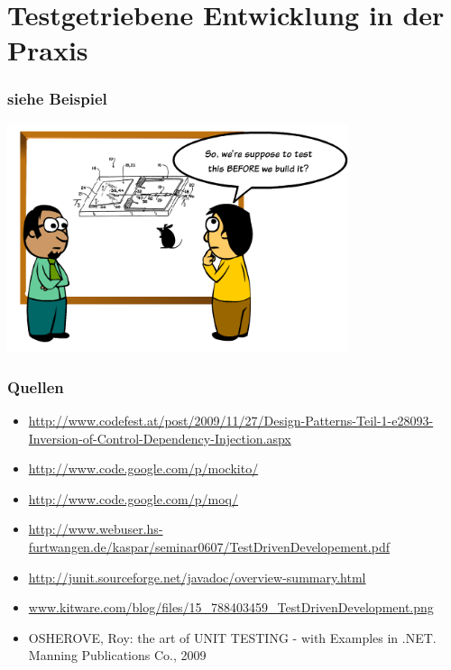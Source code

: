 \documentclass{beamer}
\begin{document}
\section{Testgetriebene Entwicklung in der Praxis}
\begin{frame}
\frametitle{siehe Beispiel}
\includegraphics[width=10cm]{TestDrivenDevelopment_155FE599.png}
\end{frame}

\begin{appendix}
\begin{frame}
\frametitle{Quellen}
\begin{itemize}
\item \url{http://www.codefest.at/post/2009/11/27/Design-Patterns-Teil-1-e28093-Inversion-of-Control-Dependency-Injection.aspx}
\item \url{http://www.code.google.com/p/mockito/}
\item \url{http://www.code.google.com/p/moq/}
\item \url{http://www.webuser.hs-furtwangen.de/kaspar/seminar0607/TestDrivenDevelopement.pdf}
\item \url{http://junit.sourceforge.net/javadoc/overview-summary.html}
\item \url{www.kitware.com/blog/files/15_788403459_TestDrivenDevelopment.png}
\item OSHEROVE, Roy: the art of UNIT TESTING - with Examples in .NET. Manning Publications Co., 2009
\end{itemize}
\end{frame}
\end{appendix}
\end{document}
